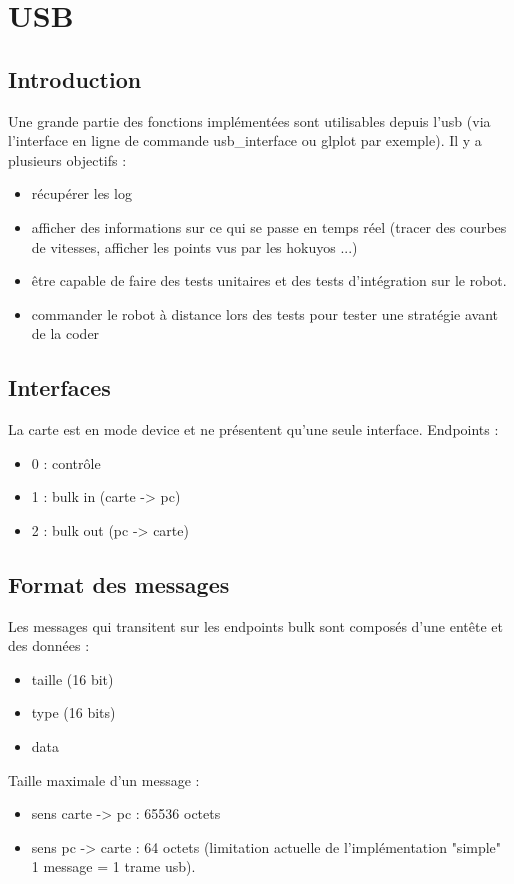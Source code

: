 \chapter{USB}

\section{Introduction}

Une grande partie des fonctions implémentées sont utilisables depuis l'usb (via l'interface en ligne de commande usb\_interface ou glplot par exemple). Il y a plusieurs objectifs :
\begin{itemize}
\item récupérer les log
\item afficher des informations sur ce qui se passe en temps réel (tracer des courbes de vitesses, afficher les points vus par les hokuyos ...)
\item être capable de faire des tests unitaires et des tests d'intégration sur le robot.
\item commander le robot à distance lors des tests pour tester une stratégie avant de la coder
\end{itemize}

\section{Interfaces}
La carte est en mode device et ne présentent qu'une seule interface.
Endpoints :
\begin{itemize}
\item 0 : contrôle
\item 1 : bulk in (carte -> pc)
\item 2 : bulk out (pc -> carte)
\end{itemize}

\section{Format des messages}

Les messages qui transitent sur les endpoints bulk sont composés d'une entête et des données :

\begin{itemize}
\item taille (16 bit)
\item type (16 bits)
\item data
\end{itemize}

\cline

Taille maximale d'un message :
\begin{itemize}
\item sens carte -> pc : 65536 octets
\item sens pc -> carte : 64 octets (limitation actuelle de l'implémentation "simple" 1 message = 1 trame usb).
\end{itemize}

\clearpage
